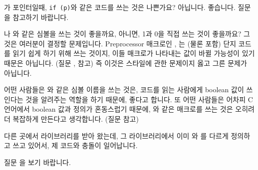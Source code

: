 \begin{faq}
	가 포인터일때, \verb+if (p)+와 같은 코드를 쓰는 것은
	나쁜가요?
\A
	아닙니다.  좋습니다.  질문 을 참고하기 바랍니다.
\end{faq}

\begin{faq}
	나 와 같은 심볼을 쓰는 것이 좋을까요, 아니면,
        1과 0을 직접 쓰는 것이 좋을까요?
\A
	그것은 여러분이 결정할 문제입니다.
	Preprocessor 매크로인 , 는 (물론
	 포함) 단지 코드를 읽기 쉽게 하기 위해 쓰는 것이지,
	이들 매크로가 나타내는 값이 바뀔 가능성이 있기 때문은
	아닙니다. (질문 ,  참고)
        즉 이것은 스타일에 관한 문제이지 옳고 그른 문제가 아닙니다.

        어떤 사람들은 와 같은 심볼 이름을 쓰는 것은, 
        코드를 읽는 사람에게 boolean 값이 쓰인다는 것을 알려주는 역할을 
        하기 때문에,
        좋다고 합니다. 또 어떤 사람들은 어차피 C 언어에서 boolean 값과 정의가
        혼동스럽기 때문에, 와 같은 매크로를 쓰는 것은 오히려
        더 복잡하게 만든다고 생각합니다. (질문  참고)
\end{faq}


\begin{faq}
	다른 곳에서 라이브러리를 받아 왔는데, 그 라이브러리에서 이미 와
        를 다르게 정의하고 쓰고 있어서, 제 코드와 충돌이 일어납니다.

\A
	질문 을 보기 바랍니다.
\end{faq}

%
%
